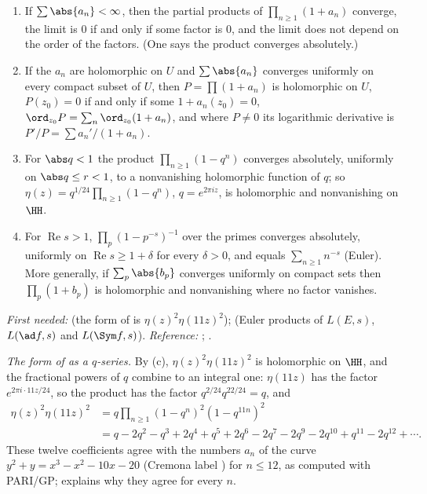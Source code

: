 \begin{theorem}\label{thm:prereq:products}
\begin{enumerate}[label=(\alph*)]
\item If $\sum\abs{a_n}<\infty$, then the partial products of $\prod_{n\ge1}(1+a_n)$ converge, the
limit is $0$ if and only if some factor is $0$, and the limit does not depend on the order of the
factors. (One says the product converges absolutely.)
\item If the $a_n$ are holomorphic on $U$ and $\sum\abs{a_n}$ converges uniformly on every compact
subset of $U$, then $P=\prod(1+a_n)$ is holomorphic on $U$, $P(z_0)=0$ if and only if some
$1+a_n(z_0)=0$, $\ord_{z_0}P=\sum_n\ord_{z_0}(1+a_n)$, and where $P\ne0$ its logarithmic derivative
is $P'/P=\sum a_n'/(1+a_n)$.
\item For $\abs q<1$ the product $\prod_{n\ge1}(1-q^n)$ converges absolutely, uniformly on
$\abs q\le r<1$, to a nonvanishing holomorphic function of $q$; so
$\eta(z)=q^{1/24}\prod_{n\ge1}(1-q^n)$, $q=e^{2\pi iz}$, is holomorphic and nonvanishing on $\HH$.
\item For $\operatorname{Re}s>1$, $\prod_p(1-p^{-s})^{-1}$ over the primes converges absolutely,
uniformly on $\operatorname{Re}s\ge1+\delta$ for every $\delta>0$, and equals $\sum_{n\ge1}n^{-s}$
(Euler). More generally, if $\sum_p\abs{b_p}$ converges uniformly on compact sets then
$\prod_p(1+b_p)$ is holomorphic and nonvanishing where no factor vanishes.
\end{enumerate}
\end{theorem}
\noindent\emph{First needed:}  (the form of  is $\eta(z)^2\eta(11z)^2$);
 (Euler products of $L(E,s)$, $L(\ad f,s)$ and $L(\Sym f,s)$).
\emph{Reference:} \cite[Chapter 5, Section 2]{Ahlfors79}; \cite[Chapter 5]{SteinShakarchi03}.

\emph{The form of  as a $q$-series.} By (c), $\eta(z)^2\eta(11z)^2$ is holomorphic on
$\HH$, and the fractional powers of $q$ combine to an integral one: $\eta(11z)$ has the factor
$e^{2\pi i\cdot11z/24}$, so the product has the factor $q^{2/24}q^{22/24}=q$, and
\begin{align*}
\eta(z)^2\eta(11z)^2&=q\prod_{n\ge1}(1-q^n)^2(1-q^{11n})^2\\
&=q-2q^2-q^3+2q^4+q^5+2q^6-2q^7-2q^9-2q^{10}+q^{11}-2q^{12}+\cdots.
\end{align*}
These twelve coefficients agree with the numbers $a_n$ of the curve $y^2+y=x^3-x^2-10x-20$ (Cremona
label ) for $n\le12$, as computed with PARI/GP;  explains why they agree
for every $n$.

